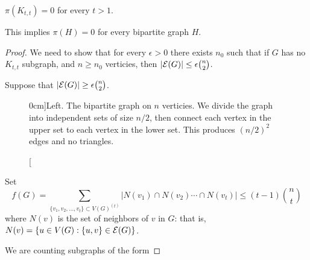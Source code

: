 \begin{theorem}
$\pi(K_{t,t})=0$ for every $t>1$.
\end{theorem}
\begin{remark}
This implies $\pi(H)=0$ for every bipartite graph $H$.
\end{remark}
\begin{proof}	
We need to show that for every $\epsilon>0$ there exists $n_0$ such that if $G$ has no $K_{t,t}$ subgraph, and $n\geq n_0$ verticies, then $|\edges (G)|\leq \epsilon{n\choose 2}$.


Suppose that $|\edges (G)|\geq \epsilon {n\choose 2}$.



\begin{figure}
\begin{center}
\end{center}
\caption[][0cm]{Left. The bipartite graph on $n$ verticies. We divide the graph into independent sets of size $n/2$, then connect each vertex in the upper set to each vertex in the lower set. This produces $(n/2)^2$ edges and no triangles. \label{fig:bipartite2}}
\end{figure}

Set
\[
f(G) = \sum_{\{v_1,v_2,\dotsc,v_t\}\subset V(G)^{(t)}} | N(v_1)\cap N(v_2)\dotsm \cap N(v_t)| \leq (t-1){n\choose t}
\]
where $N(v)$ is the set of neighbors of $v$ in $G$: that is, $N(v) = \{u\in V(G): \{u,v\} \in \edges (G) \}$.



We are counting subgraphs of the form
\begin{tikzpicture}[color=black]


\end{tikzpicture}
\end{proof}
